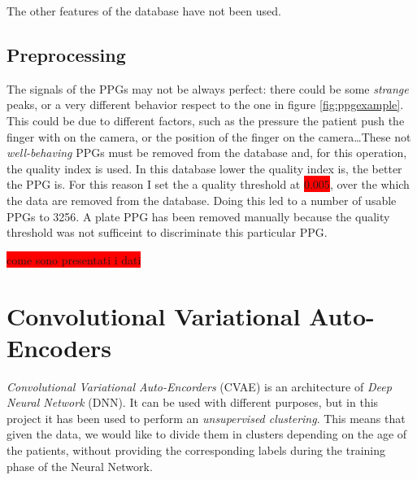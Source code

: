 \documentclass[12pt,a4paper,twocolumn]{article}
\begin{document}
			The other features of the database have not been used.
			\subsection{Preprocessing}
				The signals of the PPGs may not be always perfect: there could be some \emph{strange} peaks, or a very different behavior respect to the one in figure \ref{fig:ppgexample}.  This could be due to different factors, such as the pressure the patient push the finger with on the camera, or the position of the finger on the camera\dots These not \emph{well-behaving} PPGs must be removed from the database and, for this operation, the quality index is used. In this database lower the quality index is, the better the PPG is. For this reason I  set the a quality threshold at \colorbox{red}{0.005}, over the which the data are removed from the database. Doing this led to a number of usable PPGs to 3256. 
				A plate PPG has been removed manually because the quality threshold was not sufficeint to discriminate this particular PPG.
				
				\colorbox{red}{come sono presentati i dati}
				
		
			
		\section{Convolutional Variational Auto-Encoders}
			\label{vae_intro}
			\emph{Convolutional Variational Auto-Encorders} (CVAE) is an architecture of \emph{Deep Neural Network} (DNN). It can be used with different purposes, but in this project it has been used to perform an  \emph{unsupervised clustering}. This means that given the data, we would like to divide them in clusters depending on the age of the patients, without providing the corresponding labels during the training phase of the Neural Network. 
			
\end{document}
